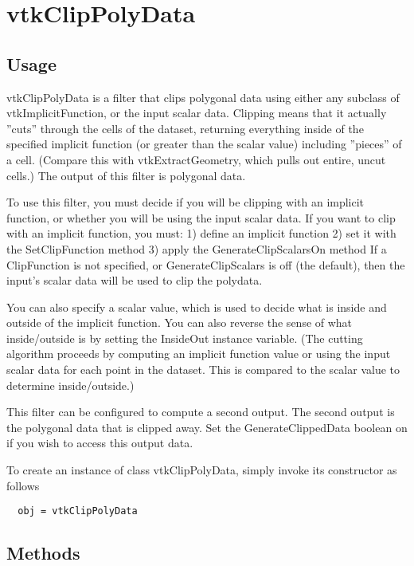 \section{vtkClipPolyData}

\subsection{Usage}

 vtkClipPolyData is a filter that clips polygonal data using either
 any subclass of vtkImplicitFunction, or the input scalar
 data. Clipping means that it actually ''cuts'' through the cells of
 the dataset, returning everything inside of the specified implicit
 function (or greater than the scalar value) including ''pieces'' of
 a cell. (Compare this with vtkExtractGeometry, which pulls out
 entire, uncut cells.) The output of this filter is polygonal data.

 To use this filter, you must decide if you will be clipping with an
 implicit function, or whether you will be using the input scalar
 data.  If you want to clip with an implicit function, you must:
 1) define an implicit function
 2) set it with the SetClipFunction method
 3) apply the GenerateClipScalarsOn method
 If a ClipFunction is not specified, or GenerateClipScalars is off
 (the default), then the input's scalar data will be used to clip
 the polydata.

 You can also specify a scalar value, which is used to
 decide what is inside and outside of the implicit function. You can
 also reverse the sense of what inside/outside is by setting the
 InsideOut instance variable. (The cutting algorithm proceeds by
 computing an implicit function value or using the input scalar data
 for each point in the dataset. This is compared to the scalar value
 to determine inside/outside.)

 This filter can be configured to compute a second output. The
 second output is the polygonal data that is clipped away. Set the
 GenerateClippedData boolean on if you wish to access this output data.

To create an instance of class vtkClipPolyData, simply
invoke its constructor as follows
\begin{verbatim}
  obj = vtkClipPolyData
\end{verbatim}
\subsection{Methods}

